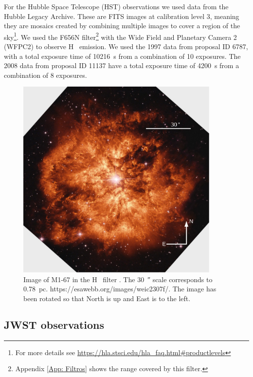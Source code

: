 \documentclass{book}
\begin{document}
For the Hubble Space Telescope (HST) observations we used data from
the Hubble Legacy Archive. These are FITS images at calibration level
3, meaning they are mosaics created by combining multiple images to
cover a region of the sky\footnote{For more details see
  \url{https://hla.stsci.edu/hla_faq.html\#productlevels}}. We used
the F656N filter\footnote{Appendix \ref{App: Filtros} shows the range
  covered by this filter.} with the Wide Field and Planetary Camera 2
(WFPC2) to observe \unit{H\alpha} emission. We used the 1997 data from
proposal ID 6787, with a total exposure time of \SI{10 216}{s} from a
combination of 10 exposures. The 2008 data from proposal ID 11137 have
a total exposure time of \SI{4200}{s} from a combination of 8
exposures.

\begin{figure}[htb]
    \centering
    \includegraphics[width=0.9\textwidth]{ultimas correcciones/WR124_HST.pdf}
    \caption{Image of M1-67 in the \unit{H\alpha} filter
      \citep{Grosdidier:1998}. The \SI{30}{\arcsecond} scale
      corresponds to \SI{0.78}{pc}.
      https://esawebb.org/images/weic2307f/. The image has been
      rotated so that North is up and East is to the left.}
    \label{fig:M1-67HST}
\end{figure}

\subsection{JWST observations}
\end{document}
